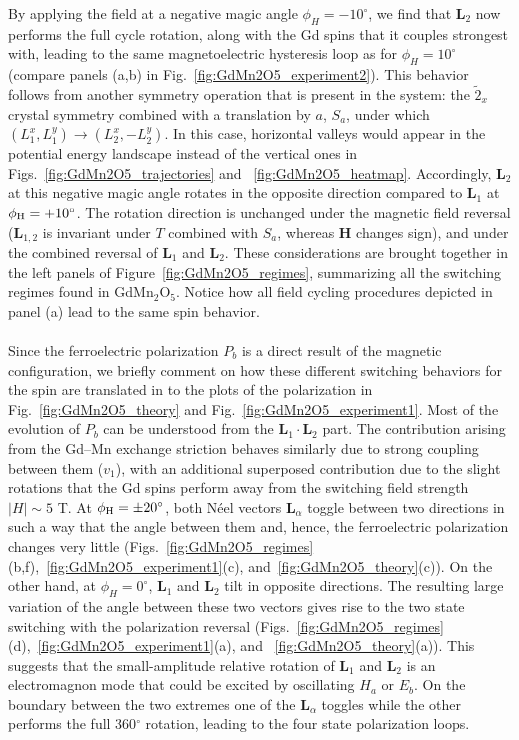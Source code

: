 By applying the field at a negative magic angle $\phi_H = -10^\circ$, we find that $\bm L_2$ now performs the full cycle rotation, along with the Gd spins that it couples strongest with, leading to the same magnetoelectric hysteresis loop as for $\phi_H = 10^\circ$ (compare panels (a,b) in Fig.~\ref{fig:GdMn2O5_experiment2}).
This behavior follows from another symmetry operation that is present in the system: the $\tilde{2}_x$ crystal symmetry combined with a translation by $a$, $S_a$, under which $(L_1^x,L_1^y) \rightarrow (L_2^x,-L_2^y)$.
In this case, horizontal valleys would appear in the potential energy landscape instead of the vertical ones in Figs.~\ref{fig:GdMn2O5_trajectories} and ~\ref{fig:GdMn2O5_heatmap}.
Accordingly, $\bm{L}_2$ at this negative magic angle rotates in the opposite direction compared to  $\bm{L}_1$ at $\phi_{\rm H} = +10^\circ$.
The rotation direction is unchanged under the magnetic field reversal ($\bm{L}_{1,2}$ is invariant under $T$ combined with $S_a$, whereas $\bm{H}$ changes sign), and under the combined reversal of $\bm{L}_{1}$ and $\bm{L}_{2}$.
These considerations are brought together in the left panels of Figure~\ref{fig:GdMn2O5_regimes}, summarizing all the switching regimes found in GdMn$_2$O$_5$.
Notice how all field cycling procedures depicted in panel (a) lead to the same spin behavior.
\\\\
%
Since the ferroelectric polarization $P_b$ is a direct result of the magnetic configuration, we briefly comment on how these different switching behaviors for the spin are translated in to the plots of the polarization in Fig.~\ref{fig:GdMn2O5_theory} and Fig.~\ref{fig:GdMn2O5_experiment1}.
Most of the evolution of $P_b$ can be understood from the $\bm L_1 \cdot \bm L_2$ part. The contribution arising from the Gd--Mn exchange striction behaves similarly due to strong coupling between them ($v_1$), with an additional superposed contribution due to the slight rotations that the Gd spins perform away from the switching field strength $|H| \sim 5$ T.
At $\phi_{\rm H} = \pm 20^\circ$, both N\'eel vectors $\bm L_\alpha$ toggle between two directions in such a way that the angle between them and, hence, the ferroelectric polarization changes very little (Figs.~\ref{fig:GdMn2O5_regimes}(b,f),~\ref{fig:GdMn2O5_experiment1}(c), and~\ref{fig:GdMn2O5_theory}(c)). 
On the other hand, at $\phi_{H}=0^\circ$, $\bm{L}_1$ and  $\bm{L}_2$ tilt in opposite directions. The resulting large variation of the angle between these two vectors gives rise to the two state switching with the polarization reversal (Figs.~\ref{fig:GdMn2O5_regimes}(d),~\ref{fig:GdMn2O5_experiment1}(a), and ~\ref{fig:GdMn2O5_theory}(a)). This suggests that the small-amplitude relative rotation of $\bm{L}_1$ and $\bm{L}_2$ is an electromagnon mode that could be excited by oscillating $H_a$ or $E_b$.
On the boundary between the two extremes one of the $\bm L_\alpha$ toggles while the other performs the full 360$^\circ$ rotation, leading to the four state polarization loops.
%
%
